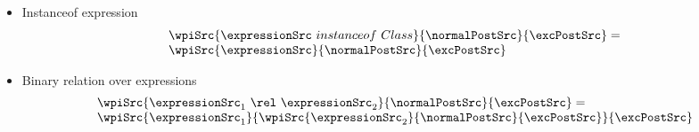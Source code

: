 \begin{itemize} 
     \item Instanceof expression
	        $$ \begin{array}{l} \wpiSrc{ \expressionSrc \ instanceof \ Class }{\normalPostSrc }{ \excPostSrc } = \\
	                \wpiSrc{ \expressionSrc  }{ \normalPostSrc }{ \excPostSrc }
	            \end{array} $$

     \item Binary relation over expressions
            $$ \begin{array}{l} \wpiSrc{ \expressionSrc_1 \ \rel \ \expressionSrc_2 }{\normalPostSrc }{ \excPostSrc } = \\
	                \wpiSrc{ \expressionSrc_1  }{  \wpiSrc{ \expressionSrc_2  }{ \normalPostSrc }{ \excPostSrc }  }{ \excPostSrc }
	            \end{array} $$
\end{itemize}


